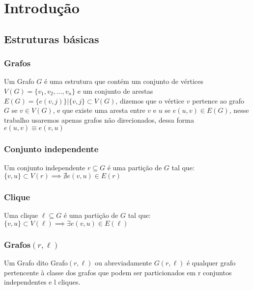 \chapter{Introdução} \label{cap:intro}

\section{Estruturas básicas}

\subsection{Grafos}
\begin{definition}
 Um Grafo $G$ é uma estrutura que contém um conjunto de vértices $V(G) = \{v_1,v_2,...,v_n\}$ e um conjunto de arestas $E(G)=\{e(v,j)\} | \{v,j\} \subset V(G)$, dizemos que o vértice $v$ pertence ao grafo $G$ se $v \in V(G)$, e que existe uma aresta entre $v$ e $u$ se $e(u,v) \in E(G)$, nesse trabalho usaremos apenas grafos não direcionados, dessa forma $e(u,v) \equiv e(v,u)$
\end{definition}

\subsection{Conjunto independente}
\begin{definition}
Um conjunto independente $r \subseteq G$ é uma partição de $G$ tal que: $ \{v,u\} \subset V(r) \implies \nexists e(v,u) \in E(r)$
\end{definition}

\subsection{Clique}
\begin{definition}
Uma clique $\ell \subseteq G$ é uma partição de $G$ tal que: $ \{v,u\} \subset V(\ell) \implies \exists e(v,u) \in E(\ell)$
\end{definition}

\subsection{Grafos$(r,\ell)$}
\begin{definition}
	Um Grafo dito Grafo$(r,\ell)$ ou abreviadamente $G(r,\ell)$ é qualquer grafo pertencente à classe dos grafos que podem ser particionados em r conjuntos independentes e l cliques.
\end{definition}

